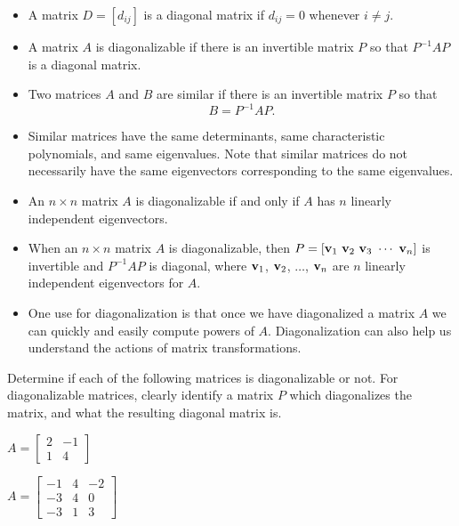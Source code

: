 \label{sec:diag_summ}
\begin{itemize}
\item A matrix $D = [d_{ij}]$ is a diagonal matrix if $d_{ij} = 0$ whenever $i \neq j$.
\item A matrix $A$ is diagonalizable if there is an invertible matrix $P$ so that $P^{-1}AP$ is a diagonal matrix.
\item Two matrices $A$ and $B$ are similar if there is an invertible matrix $P$ so that 
\[B = P^{-1}AP.\]
\item Similar matrices have the same determinants, same characteristic polynomials, and same eigenvalues. Note that similar matrices do not necessarily have the same eigenvectors corresponding to the same eigenvalues. 
\item An $n \times n$ matrix $A$ is diagonalizable if and only if $A$ has $n$ linearly independent eigenvectors.
\item When an $n \times n$ matrix $A$ is diagonalizable, then $P = [ \vv_1  \ \vv_2  \ \vv_3  \ \cdots  \ \vv_n]$ is invertible and $P^{-1}AP$ is diagonal, where $\mathbf{v}_1$, $\mathbf{v}_2$, $\ldots$, $\mathbf{v}_n$ are $n$ linearly independent eigenvectors for $A$.
\item One use for diagonalization is that once we have diagonalized a matrix $A$ we can quickly and easily compute powers of $A$. Diagonalization can also help us understand the actions of matrix transformations. 
\end{itemize}



\label{sec:diag_exer}
\be
\item Determine if each of the following matrices is diagonalizable or not. For diagonalizable matrices, clearly identify a matrix $P$ which diagonalizes the matrix, and what the resulting diagonal matrix is.
\ba
\item $A=\left[ \begin{array}{cr} 2&-1\\ 1&4 \end{array} \right]$

\item $A=\left[ \begin{array}{rcr} -1 & 4 & -2 \\ -3 & 4 & 0 \\ -3 & 1 & 3 \end{array} \right]$
\ea

